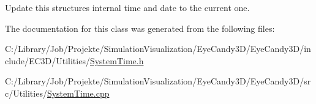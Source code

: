 Update this structures internal time and date to the current one. 



The documentation for this class was generated from the following files\+:\begin{DoxyCompactItemize}
\item 
C\+:/\+Library/\+Job/\+Projekte/\+Simulation\+Visualization/\+Eye\+Candy3\+D/\+Eye\+Candy3\+D/include/\+E\+C3\+D/\+Utilities/\mbox{\hyperlink{_system_time_8h}{System\+Time.\+h}}\item 
C\+:/\+Library/\+Job/\+Projekte/\+Simulation\+Visualization/\+Eye\+Candy3\+D/\+Eye\+Candy3\+D/src/\+Utilities/\mbox{\hyperlink{_system_time_8cpp}{System\+Time.\+cpp}}\end{DoxyCompactItemize}
